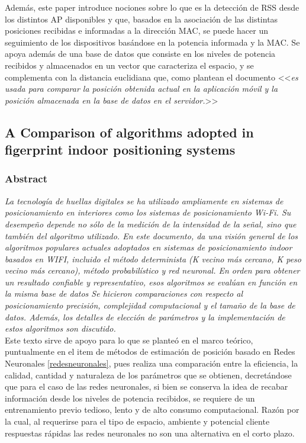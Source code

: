 Además, este paper introduce nociones sobre lo que es la detección de \ac{RSS} desde los distintos AP disponibles y que, basados en la asociación de las distintas posiciones recibidas e informadas a la dirección MAC, se puede hacer un seguimiento de los dispositivos basándose en la potencia informada y la MAC. Se apoya además de una base de datos que consiste en los niveles de potencia recibidos y almacenados en un vector que caracteriza el espacio, y se complementa con la distancia euclidiana que, como plantean el documento <<\textit{es usada para comparar la posición obtenida actual en la aplicación móvil y la posición almacenada en la base de datos en el servidor.}>>

\subsection{A Comparison of algorithms adopted in figerprint indoor positioning systems}
\subsubsection{Abstract}

\emph{La tecnología de huellas digitales se ha utilizado ampliamente en sistemas de posicionamiento en interiores como los sistemas de posicionamiento Wi-Fi. Su desempeño depende no sólo de la medición de la intensidad de la señal, sino que también del algoritmo utilizado. En este documento, da una visión general de los algoritmos populares actuales adoptados en sistemas de posicionamiento indoor basados en WIFI, incluido el método determinista (K vecino más cercano, K peso vecino más cercano), método probabilístico y red neuronal. En orden para obtener un resultado confiable y representativo, esos algoritmos se evalúan en función en la misma base de datos Se hicieron comparaciones con respecto al posicionamiento precisión, complejidad computacional y el tamaño de la base de datos. Además, los detalles de elección de parámetros y la implementación de estos algoritmos son discutido.}\\

Este texto sirve de apoyo para lo que se planteó en el marco teórico, puntualmente en el item de métodos de estimación de posición basado en Redes Neuronales \ref{redesneuronales}, pues realiza una comparación entre la eficiencia, la calidad, cantidad y naturaleza de los parámetros que se obtienen, decretándose que para el caso de las redes neuronales, si bien se conserva la idea de recabar información desde los niveles de potencia recibidos,  se requiere de un entrenamiento previo tedioso, lento y de alto consumo computacional. Razón por la cual, al requerirse para el tipo de espacio, ambiente y potencial cliente respuestas rápidas las redes neuronales no son una alternativa en el corto plazo.\\

